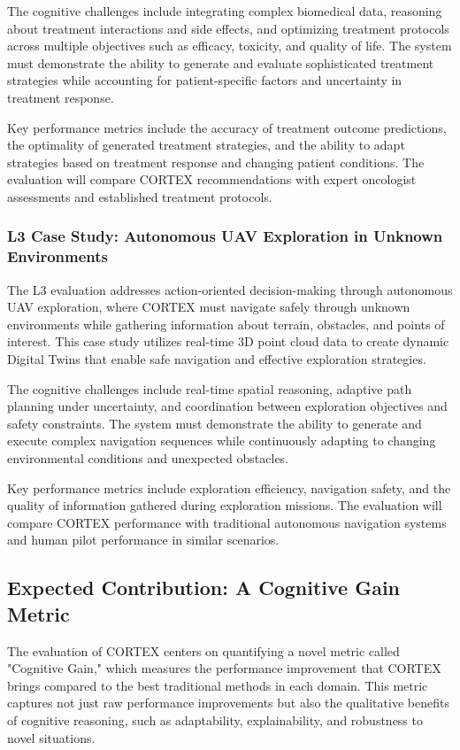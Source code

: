The cognitive challenges include integrating complex biomedical data, reasoning about treatment interactions and side effects, and optimizing treatment protocols across multiple objectives such as efficacy, toxicity, and quality of life. The system must demonstrate the ability to generate and evaluate sophisticated treatment strategies while accounting for patient-specific factors and uncertainty in treatment response.

Key performance metrics include the accuracy of treatment outcome predictions, the optimality of generated treatment strategies, and the ability to adapt strategies based on treatment response and changing patient conditions. The evaluation will compare CORTEX recommendations with expert oncologist assessments and established treatment protocols.

\subsubsection{L3 Case Study: Autonomous UAV Exploration in Unknown Environments}

The L3 evaluation addresses action-oriented decision-making through autonomous UAV exploration, where CORTEX must navigate safely through unknown environments while gathering information about terrain, obstacles, and points of interest. This case study utilizes real-time 3D point cloud data to create dynamic Digital Twins that enable safe navigation and effective exploration strategies.

The cognitive challenges include real-time spatial reasoning, adaptive path planning under uncertainty, and coordination between exploration objectives and safety constraints. The system must demonstrate the ability to generate and execute complex navigation sequences while continuously adapting to changing environmental conditions and unexpected obstacles.

Key performance metrics include exploration efficiency, navigation safety, and the quality of information gathered during exploration missions. The evaluation will compare CORTEX performance with traditional autonomous navigation systems and human pilot performance in similar scenarios.

\subsection{Expected Contribution: A Cognitive Gain Metric}

The evaluation of CORTEX centers on quantifying a novel metric called "Cognitive Gain," which measures the performance improvement that CORTEX brings compared to the best traditional methods in each domain. This metric captures not just raw performance improvements but also the qualitative benefits of cognitive reasoning, such as adaptability, explainability, and robustness to novel situations.

